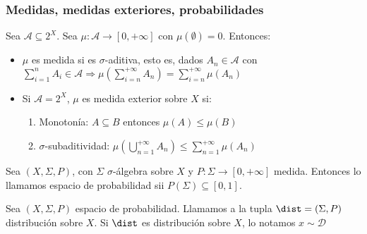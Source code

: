  \begin{frame}\frametitle{Medidas, medidas exteriores, probabilidades}
 \begin{definition}
  Sea $\mathcal{A} \subseteq 2^X$. Sea $\mu: \mathcal{A} \rightarrow [0, +\infty]$ con $\mu(\emptyset) = 0$. Entonces:
  
  \begin{itemize}
   \item $\mu$ es medida si es $\sigma$-aditiva, esto es, dados $A_n \in \mathcal{A}$ con 
   $\sum_{i=1}^n A_i \in \mathcal{A} \Rightarrow \mu\left(\sum_{i=n}^{+\infty} A_n \right)= \sum_{i=n}^{+\infty} \mu(A_n)$
  
   \item Si $\mathcal{A}=2^X$, $\mu$ es medida exterior sobre $X$ si:
  
    \begin{enumerate}[i]
     \item Monotonía: $A\subseteq B$ entonces $\mu(A) \le \mu(B)$
     \item $\sigma$-subaditividad: $\mu \left(\bigcup_{n=1}^{+\infty} A_n \right) \le \sum_{n=1}^{+\infty} \mu (A_n)$
    \end{enumerate}
  \end{itemize}
 \end{definition}

 \begin{definition}
  Sea $(X, \Sigma, P)$, con $\Sigma$ $\sigma$-álgebra sobre $X$ y $P:\Sigma \rightarrow [0, +\infty]$ medida. 
  Entonces lo llamamos espacio de probabilidad sii $P(\Sigma)\subseteq [0,1]$.
 \end{definition}
 
 \begin{definition}
  Sea $(X, \Sigma, P)$ espacio de probabilidad. Llamamos a la tupla $\dist = (\Sigma,P)$ distribución sobre $X$. 
  Si $\dist$ es distribución sobre $X$, lo notamos $x\sim \mathcal{D}$
 \end{definition}
 \end{frame}
 
